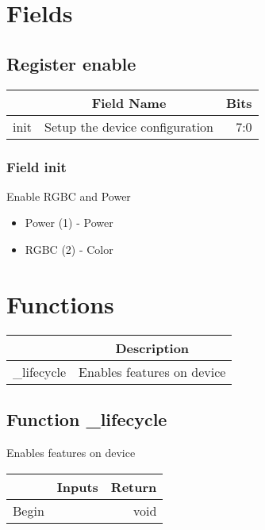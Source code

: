 \documentclass[a4paper,12pt,oneside,pdflatex,italian,final,twocolumn]{article}
\begin{document}
\raggedright

\section{Fields}



\raggedright

\subsection{Register enable}
\centering
\begin{tabular}{lcr}
\toprule
  & Field Name & Bits \\
\midrule
init & Setup the device configuration &
7:0
\\
\bottomrule

\end{tabular}


\raggedright

\subsubsection{Field init }

Enable RGBC and Power

\begin{itemize}
\item Power (1) - Power
\item RGBC (2) - Color
\end{itemize}




\raggedright

\section{Functions}

\centering
\begin{tabular}{lc}
\toprule
  & Description \\
\midrule
_lifecycle & Enables features on device \\
\bottomrule
\end{tabular}


\raggedright
\subsection{Function _lifecycle }
Enables features on device \\

\centering
\begin{tabular}{lcr}
\toprule
  & Inputs & Return \\
\midrule
Begin &
&
void
\\
\bottomrule
\end{tabular}



\raggedright
\end{document}
